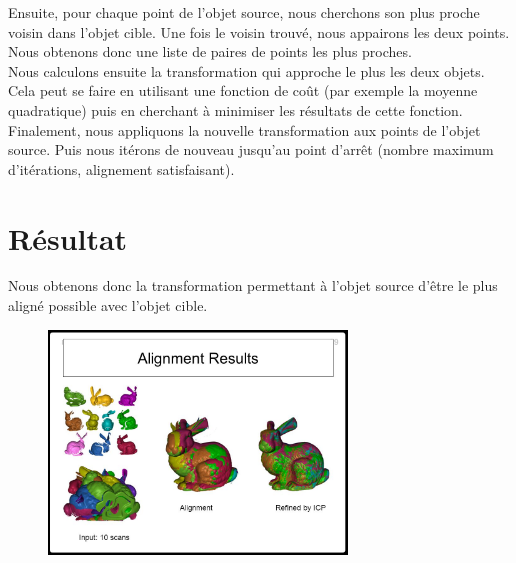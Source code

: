 \documentclass[a4paper]{article}
\begin{document}
Ensuite, pour chaque point de l'objet source, nous cherchons son plus proche voisin dans l'objet cible. Une fois le voisin trouvé, nous appairons les deux points. Nous obtenons donc une liste de paires de points les plus proches.\\

Nous calculons ensuite la transformation qui approche le plus les deux objets. Cela peut se faire en utilisant une fonction de coût (par exemple la moyenne quadratique) puis en cherchant à minimiser les résultats de cette fonction.\\

Finalement, nous appliquons la nouvelle transformation aux points de l'objet source. Puis nous itérons de nouveau jusqu'au point d'arrêt (nombre maximum d'itérations, alignement satisfaisant).

\section{Résultat}
Nous obtenons donc la transformation permettant à l'objet source d'être le plus aligné possible avec l'objet cible.

\begin{figure}[H]
\begin{center}
\includegraphics[width=300px]{results.jpg}
\end{center}
\end{figure}

\end{document}
